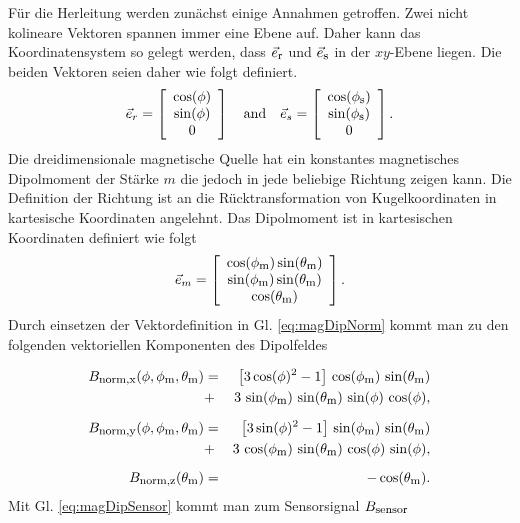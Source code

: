 	Für die Herleitung werden zunächst einige Annahmen getroffen. Zwei nicht kolineare Vektoren spannen immer eine Ebene auf. Daher kann das Koordinatensystem so gelegt werden, dass $\vec{e}_{\textrm{\footnotesize{r}}}$ und $\vec{e}_{\textrm{\footnotesize{s}}}$ in der $xy$-Ebene liegen. Die beiden Vektoren seien daher wie folgt definiert.
	\begin{equation}
		\vec{e}_r = \left[\begin{array}{c} \cos(\phi)\\ \sin(\phi) \\ 0\end{array}\right] \quad \textrm{and} \quad
		\vec{e}_s = \left[\begin{array}{c} \cos(\phi_{\textrm{\footnotesize{s}}})\\ \sin(\phi_{\textrm{\footnotesize{s}}}) \\ 0\end{array}\right].
		\label{eq:defErEs}
	\end{equation}
	Die dreidimensionale magnetische Quelle hat ein konstantes magnetisches Dipolmoment der Stärke $m$ die jedoch in jede beliebige Richtung zeigen kann. Die Definition der Richtung ist an die Rücktransformation von Kugelkoordinaten in kartesische Koordinaten angelehnt. Das Dipolmoment ist in kartesischen Koordinaten definiert wie folgt
	\begin{equation}
		\vec{e}_m = \left[\begin{array}{c} \cos(\phi_{\textrm{\footnotesize{m}}})\sin(\theta_{\textrm{\footnotesize{m}}})\\ \sin(\phi_{\textrm{\footnotesize{m}}})\sin(\theta_{\textrm{\footnotesize{m}}}) \\ \cos(\theta_{\textrm{\footnotesize{m}}}) \end{array}\right].
		\label{eq:defEm}
	 \end{equation}
	Durch einsetzen der Vektordefinition in Gl. \ref{eq:magDipNorm} kommt man zu den folgenden vektoriellen Komponenten des Dipolfeldes

	 \begin{eqnarray}
		B_{\textrm{\footnotesize{norm,x}}}(\phi,\phi_{\textrm{\footnotesize{m}}},\theta_{\textrm{\footnotesize{m}}})&=&\big[3\cos(\phi)^2-1\big]\,\cos(\phi_{\textrm{\footnotesize{m}}})\,\sin(\theta_{\textrm{\footnotesize{m}}}) \nonumber \\ &+&  3 \,\sin(\phi_{\textrm{\footnotesize{m}}})\,\sin(\theta_{\textrm{\footnotesize{m}}})\,\sin(\phi)\,\cos(\phi),
		\label{eq:magNormX} \\[2mm]
		B_{\textrm{\footnotesize{norm,y}}}(\phi,\phi_{\textrm{\footnotesize{m}}},\theta_{\textrm{\footnotesize{m}}})&=&\big[3\sin(\phi)^2-1\big]\,\sin(\phi_{\textrm{\footnotesize{m}}})\,\sin(\theta_{\textrm{\footnotesize{m}}}) \nonumber\\ &+& 3 \,\cos(\phi_{\textrm{\footnotesize{m}}})\,\sin(\theta_{\textrm{\footnotesize{m}}})\,\cos(\phi)\,\sin(\phi),
		\label{eq:magNormY} \\[2mm]
		B_{\textrm{\footnotesize{norm,z}}}(\theta_{\textrm{\footnotesize{m}}}) &=& - \cos(\theta_{\textrm{\footnotesize{m}}}).
		\label{eq:magNormZ}
	\end{eqnarray}
	Mit Gl. \ref{eq:magDipSensor} kommt man zum Sensorsignal $B_{\textrm{\footnotesize{sensor}}}$

